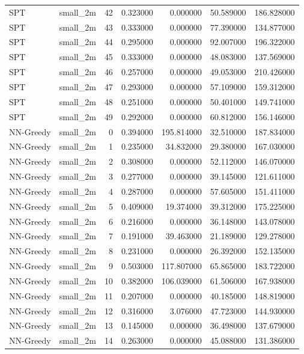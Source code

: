 \begin{tabular}{llrrrrr}
SPT & small_2m & 42 & 0.323000 & 0.000000 & 50.589000 & 186.828000 \\
SPT & small_2m & 43 & 0.333000 & 0.000000 & 77.390000 & 134.877000 \\
SPT & small_2m & 44 & 0.295000 & 0.000000 & 92.007000 & 196.322000 \\
SPT & small_2m & 45 & 0.333000 & 0.000000 & 48.083000 & 137.569000 \\
SPT & small_2m & 46 & 0.257000 & 0.000000 & 49.053000 & 210.426000 \\
SPT & small_2m & 47 & 0.293000 & 0.000000 & 57.109000 & 159.312000 \\
SPT & small_2m & 48 & 0.251000 & 0.000000 & 50.401000 & 149.741000 \\
SPT & small_2m & 49 & 0.292000 & 0.000000 & 60.812000 & 156.146000 \\
NN-Greedy & small_2m & 0 & 0.394000 & 195.814000 & 32.510000 & 187.834000 \\
NN-Greedy & small_2m & 1 & 0.235000 & 34.832000 & 29.380000 & 167.030000 \\
NN-Greedy & small_2m & 2 & 0.308000 & 0.000000 & 52.112000 & 146.070000 \\
NN-Greedy & small_2m & 3 & 0.277000 & 0.000000 & 39.145000 & 121.611000 \\
NN-Greedy & small_2m & 4 & 0.287000 & 0.000000 & 57.605000 & 151.411000 \\
NN-Greedy & small_2m & 5 & 0.409000 & 19.374000 & 39.312000 & 175.225000 \\
NN-Greedy & small_2m & 6 & 0.216000 & 0.000000 & 36.148000 & 143.078000 \\
NN-Greedy & small_2m & 7 & 0.191000 & 39.463000 & 21.189000 & 129.278000 \\
NN-Greedy & small_2m & 8 & 0.231000 & 0.000000 & 26.392000 & 152.135000 \\
NN-Greedy & small_2m & 9 & 0.503000 & 117.807000 & 65.865000 & 183.722000 \\
NN-Greedy & small_2m & 10 & 0.382000 & 106.039000 & 61.506000 & 167.938000 \\
NN-Greedy & small_2m & 11 & 0.207000 & 0.000000 & 40.185000 & 148.819000 \\
NN-Greedy & small_2m & 12 & 0.316000 & 3.076000 & 47.723000 & 144.930000 \\
NN-Greedy & small_2m & 13 & 0.145000 & 0.000000 & 36.498000 & 137.679000 \\
NN-Greedy & small_2m & 14 & 0.263000 & 0.000000 & 45.088000 & 131.386000 \\

\end{tabular}
